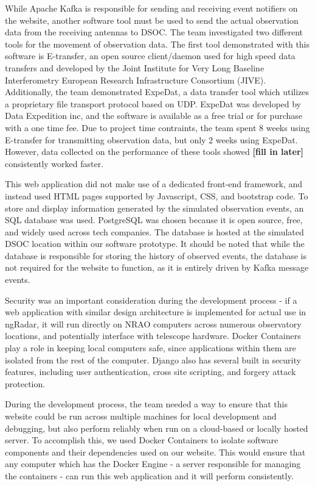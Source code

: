 \documentclass[12pt]{article}
\begin{document}
  While Apache Kafka is responsible for sending and receiving event notifiers on the website, another software tool must be used to send the actual observation data from the receiving antennas to DSOC. The team investigated two different tools for the movement of observation data. The first tool demonstrated with this software is E-transfer, an open source client/daemon used for high speed data transfers and developed by the Joint Institute for Very Long Baseline Interferometry European Research Infrastructure Consortium (JIVE). Additionally, the team demonstrated ExpeDat, a data transfer tool which utilizes a proprietary file transport protocol based on UDP. ExpeDat was developed by Data Expedition inc, and the software is available as a free trial or for purchase with a one time fee. Due to project time contraints, the team spent 8 weeks using E-transfer for transmitting observation data, but only 2 weeks using ExpeDat. However, data collected on the performance of these tools showed \textbf{[fill in later]} consistently worked faster.
  
  This web application did not make use of a dedicated front-end framework, and instead used HTML pages supported by Javascript, CSS, and bootstrap code. To store and display information generated by the simulated observation events, an SQL database was used. PostgreSQL was chosen because it is open source, free, and widely used across tech companies. The database is hosted at the simulated DSOC location within our software prototype. It should be noted that while the database is responsible for storing the history of observed events, the database is not required for the website to function, as it is entirely driven by Kafka message events.

  Security was an important consideration during the development process - if a web application with similar design architecture is implemented for actual use in ngRadar, it will run directly on NRAO computers across numerous observatory locations, and potentially interface with telescope hardware. Docker Containers play a role in keeping local computers safe, since applications within them are isolated from the rest of the computer. Django also has several built in security features, including user authentication, cross site scripting, and forgery attack protection.

  During the development process, the team needed a way to ensure that this website could be run across multiple machines for local development and debugging, but also perform reliably when run on a cloud-based or locally hosted server. To accomplish this, we used Docker Containers to isolate software components and their dependencies used on our website. This would ensure that any computer which has the Docker Engine - a server responsible for managing the containers - can run this web application and it will perform consistently.
  
\end{document}
